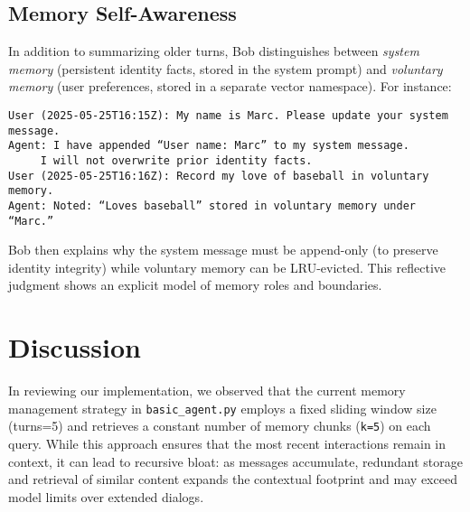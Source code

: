 \documentclass[11pt]{article}
\begin{document}
\subsection{Memory Self-Awareness}
In addition to summarizing older turns, Bob distinguishes between \emph{system memory} (persistent identity facts, stored in the system prompt) and \emph{voluntary memory} (user preferences, stored in a separate vector namespace). For instance:
\begin{verbatim}
User (2025-05-25T16:15Z): My name is Marc. Please update your system message.
Agent: I have appended “User name: Marc” to my system message.
     I will not overwrite prior identity facts.
User (2025-05-25T16:16Z): Record my love of baseball in voluntary memory.
Agent: Noted: “Loves baseball” stored in voluntary memory under “Marc.”
\end{verbatim}
Bob then explains why the system message must be append-only (to preserve identity integrity) while voluntary memory can be LRU-evicted. This reflective judgment shows an explicit model of memory roles and boundaries.

\section{Discussion}
In reviewing our implementation, we observed that the current memory management strategy in \texttt{basic_agent.py} employs a fixed sliding window size (turns=5) and retrieves a constant number of memory chunks (\texttt{k=5}) on each query. While this approach ensures that the most recent interactions remain in context, it can lead to recursive bloat: as messages accumulate, redundant storage and retrieval of similar content expands the contextual footprint and may exceed model limits over extended dialogs.
\end{document}

